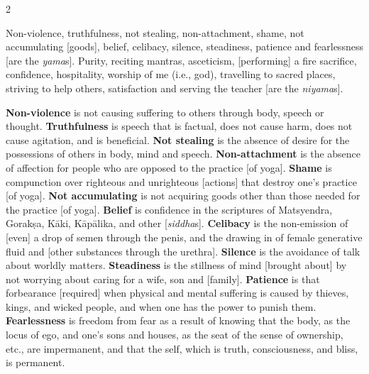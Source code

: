 \begin{nohyp}
\begin{multicols}{2}
\begin{eng}
Non-violence, truthfulness, not stealing, non-attachment, shame, not accumulating [goods], belief, celibacy, silence, steadiness, patience and fearlessness [are the  \textit{yama}s]. Purity, reciting mantras, asceticism, [performing] a fire \mbox{sacrifice,} confidence, hospitality, worship of me (i.e., god), travelling to sacred places, striving to help others, satisfaction and serving the teacher [are the \textit{niyama}s].

\textbf{Non-violence} is not causing suffering to others through body, speech or thought. \textbf{Truthfulness} is speech that is factual, does not cause harm, does not cause agitation, and is beneficial. \textbf{Not stealing} is the absence of desire for the possessions of others in body, mind and speech. \textbf{Non-attachment} is the absence of affection for people who are opposed to the practice [of yoga]. \textbf{Shame} is compunction over righteous and unrighteous [actions] that destroy one’s practice [of yoga]. \textbf{Not accumulating} is not acquiring goods other than those needed for the practice [of yoga]. \textbf{Belief} is confidence in the scriptures of Matsyendra, Gorakṣa, Kāki, Kāpālika, and other [\textit{siddha}s]. \textbf{Celibacy} is the non-emission of [even] a drop of semen through the penis, and the drawing in of female generative fluid and [other substances through the urethra]. \textbf{Silence} is the avoidance of talk about worldly matters. \textbf{Steadiness} is the stillness of mind [brought about] by not worrying about caring for a wife, son and [family]. \textbf{Patience} is that forbearance [required] when physical and mental suffering is caused by thieves, kings, and wicked people, and when one has the power to punish them. \textbf{Fearlessness} is freedom from fear as a result of knowing that the body, as the locus of ego, and one’s sons and houses, as the seat of the sense of ownership, etc., are impermanent, and that the self, which is truth, consciousness, and bliss, is permanent.


\end{eng}
\end{multicols}
\end{nohyp}
